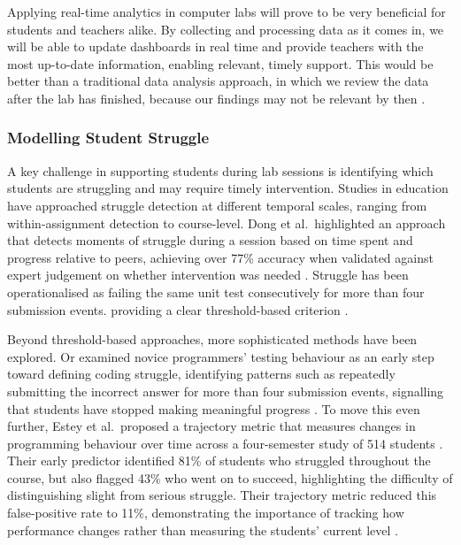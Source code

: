 Applying real-time analytics in computer labs will prove to be very beneficial for students and teachers alike. By collecting and processing data as it comes in, we will be able to update dashboards in real time and provide teachers with the most up-to-date information, enabling relevant, timely support. This would be better than a traditional data analysis approach, in which we review the data after the lab has finished, because our findings may not be relevant by then \cite{montebello_assisting,mustafaayobamiraji_2024_realtime}.

\subsubsection{Modelling Student Struggle}
A key challenge in supporting students during lab sessions is identifying which students are struggling and may require timely intervention.
Studies in education have approached struggle detection at different temporal scales, ranging from within-assignment detection to course-level.
Dong et al.\ highlighted an approach that detects moments of struggle during a session based on time spent and progress relative to peers, achieving over 77\% accuracy when validated against expert judgement on whether intervention was needed \cite{dong_using}.
Struggle has been operationalised as failing the same unit test consecutively for more than four submission events. providing a clear threshold-based criterion \cite{dong_using}.

Beyond threshold-based approaches, more sophisticated methods have been explored. 
Or examined novice programmers' testing behaviour as an early step toward defining coding struggle, identifying patterns such as repeatedly submitting the incorrect answer for more than four submission events, signalling that students have stopped making meaningful progress \cite{or_2024_exploring}.
To move this even further, Estey et al.\ proposed a trajectory metric that measures changes in programming behaviour over time across a four-semester study of 514 students \cite{estey_2017_automatically}. 
Their early predictor identified 81\% of students who struggled throughout the course, but also flagged 43\% who went on to succeed, highlighting the difficulty of distinguishing slight from serious struggle.
Their trajectory metric reduced this false-positive rate to 11\%, demonstrating the importance of tracking how performance changes rather than measuring the students' current level \cite{estey_2017_automatically}.

